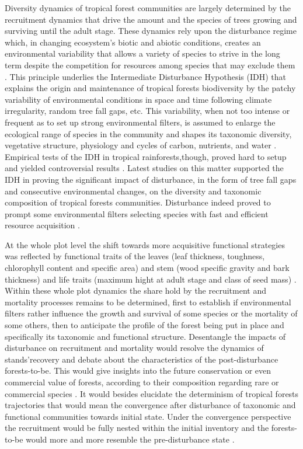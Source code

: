 \documentclass[fleqn,10pt]{ArtEcoFoG} %
\begin{document}
Diversity dynamics of tropical forest communities are largely determined
by the recruitment dynamics that drive the amount and the species of
trees growing and surviving until the adult stage. These dynamics rely
upon the disturbance regime which, in changing ecosystem's biotic and
abiotic conditions, creates an environmental variability that allows a
variety of species to strive in the long term despite the competition
for resources among species that may exclude them \citep{Denslow1980}.
This principle underlies the Intermediate Disturbance Hypothesis (IDH)
that explains the origin and maintenance of tropical forests
biodiversity by the patchy variability of environmental conditions in
space and time following climate irregularity, random tree fall gaps,
etc. This variability, when not too intense or frequent as to set up
strong environmental filters, is assumed to enlarge the ecological range
of species in the community \citep{Molino2001, Bongers2009} and shapes
its taxonomic diversity, vegetative structure, physiology and cycles of
carbon, nutrients, and water \citep{Anderson-Teixeira2013}. Empirical
tests of the IDH in tropical rainforests,though, proved hard to setup
and yielded controversial results
\citep{Hubbell1999, Molino2001, Sheil2003}. Latest studies on this
matter supported the IDH in proving the significant impact of
disturbance, in the form of tree fall gaps and consecutive environmental
changes, on the diversity and taxonomic composition of tropical forests
communities. Disturbance indeed proved to prompt some environmental
filters selecting species with fast and efficient resource acquisition
\citep[Mirabel2018, in prep.]{Baraloto2012a}.

At the whole plot level the shift towards more acquisitive functional
strategies was reflected by functional traits of the leaves (leaf
thickness, toughness, chlorophyll content and specific area) and stem
(wood specific gravity and bark thickness) and life traits (maximum
hight at adult stage and class of seed mass)
\citep{Wright2004, Chave2009b, Herault2011}. Within these whole plot
dynamics the share hold by the recruitment and mortality processes
remains to be determined, first to establish if environmental filters
rather influence the growth and survival of some species or the
mortality of some others, then to anticipate the profile of the forest
being put in place and specifically its taxonomic and functional
structure. Desentangle the impacts of disturbance on recruitment and
mortality would resolve the dynamics of stands'recovery and debate about
the characteristics of the post-disturbance forests-to-be. This would
give insights into the future conservation or even commercial value of
forests, according to their composition regarding rare or commercial
species \citep{Diaz2005, Gardner2007, Schwartz2017}. It would besides
elucidate the determinism of tropical forests trajectories that would
mean the convergence after disturbance of taxonomic and functional
communities towards initial state. Under the convergence perspective the
recruitment would be fully nested within the initial inventory and the
forests-to-be would more and more resemble the pre-disturbance state
\citep{Meiners2015, Li2016}.
\end{document}
